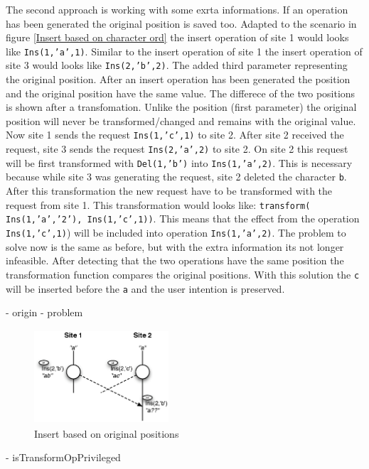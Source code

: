 \begin{itemize}
The second approach is working with some exrta informations. If an operation has been generated the original position is saved too. Adapted to the scenario in figure \ref{Insert based on character ord} the insert operation of site 1 would looks like \texttt{Ins(1,'a',1)}. Similar to the insert operation of site 1 the insert operation of site 3 would looks like \texttt{Ins(2,'b',2)}. The added third parameter representing the original position. After an insert operation has been generated the position and the original position have the same value. The differece of the two positions is shown after a transfomation. Unlike the position (first parameter) the original position will never be transformed/changed and remains with the original value.
Now site 1 sends the request \texttt{Ins(1,'c',1)} to site 2. After site 2 received the request, site 3 sends the request \texttt{Ins(2,'a',2)} to site 2. On site 2 this request will be first transformed with \texttt{Del(1,'b')} into \texttt{Ins(1,'a',2)}. This is necessary because while site 3 was generating the request, site 2 deleted the character \texttt{b}. After this transformation the new request have to be transformed with the request from site 1. This transformation would looks like: \texttt{transform( Ins(1,'a','2'), Ins(1,'c',1))}. This means that the effect from the operation \texttt{Ins(1,'c',1)}) will be included into operation \texttt{Ins(1,'a',2)}. The problem to solve now is the same as before, but with the extra information its not longer infeasible. After detecting that the two operations have the same position the transformation function compares the original positions. With this solution the \texttt{c} will be inserted before the \texttt{a} and the user intention is preserved.


  - origin
    - problem
\begin{figure}[H]
\centering
\includegraphics[height=3.5cm,width=5cm]{../../images/algo-impl/transform_ins_ins_origpos.eps}
\caption{Insert based on original positions}
\label{Insert based on original positions}
\end{figure}
  - isTransformOpPrivileged
\end{itemize}

